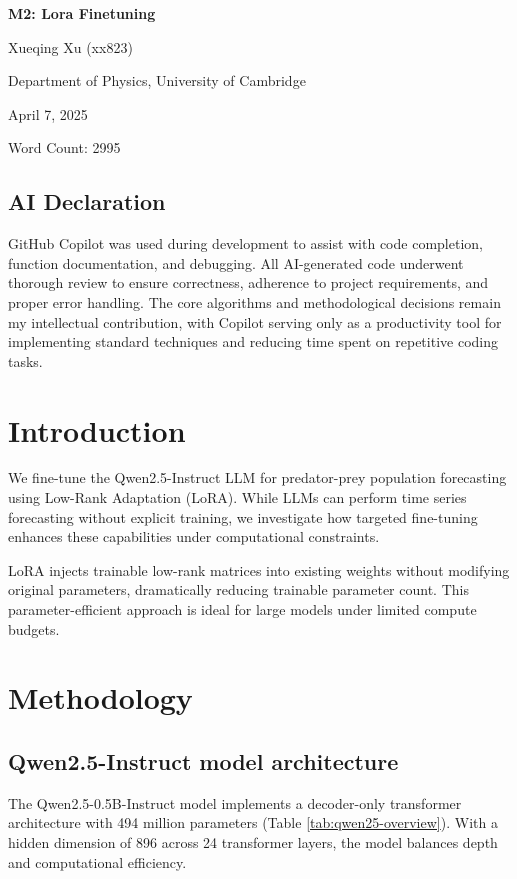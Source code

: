 \documentclass{article}
\begin{document}
\begin{center}
    \huge\textbf{M2: Lora Finetuning}
\end{center}



\begin{center}
    \Large Xueqing Xu (xx823)
    
    Department of Physics, University of Cambridge
    
    April 7, 2025
\end{center}
Word Count: 2995
\subsection*{AI Declaration}
GitHub Copilot was used during development to assist with code completion, function documentation, and debugging. All AI-generated code underwent thorough review to ensure correctness, adherence to project requirements, and proper error handling. The core algorithms and methodological decisions remain my intellectual contribution, with Copilot serving only as a productivity tool for implementing standard techniques and reducing time spent on repetitive coding tasks.
\section*{Introduction}
We fine-tune the Qwen2.5-Instruct LLM for predator-prey population forecasting using Low-Rank Adaptation (LoRA). While LLMs can perform time series forecasting without explicit training\cite{gruver2023large}, we investigate how targeted fine-tuning enhances these capabilities under computational constraints.

LoRA injects trainable low-rank matrices into existing weights without modifying original parameters, dramatically reducing trainable parameter count. This parameter-efficient approach is ideal for large models under limited compute budgets.
\section*{Methodology}
\subsection*{Qwen2.5-Instruct model architecture}
The Qwen2.5-0.5B-Instruct model implements a decoder-only transformer architecture with 494 million parameters (Table \ref{tab:qwen25-overview}). With a hidden dimension of 896 across 24 transformer layers, the model balances depth and computational efficiency.
\end{document}
